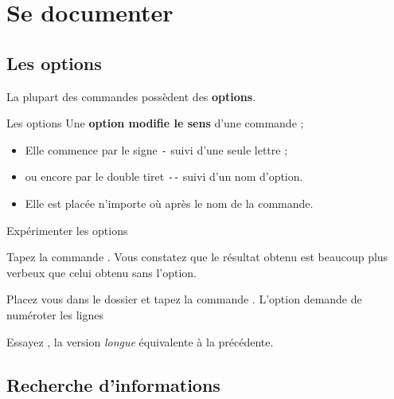 \documentclass[a4paper,11pt]{style-esi/td}
\begin{document}
\entete
\titre
{}
\lastedit

\bigskip
\tableofcontents

\newpage

\section{Se documenter}


	\subsection{Les options}
	
		La plupart des commandes possèdent des \textbf{options}.

		\begin{theorie}{Les options}
			Une \textbf{option modifie le sens} d'une commande ;
			\begin{itemize}
			\item Elle commence par le signe \texttt{-} suivi d'une seule lettre ;
			\item ou encore par le double tiret \texttt{-{}-} suivi d'un nom d'option.
			\item Elle est placée n'importe où après le nom de la commande.   
			\end{itemize}
		\end{theorie}		

		\begin{Experience}{Expérimenter les options}		
			\vspace{-1em}
			\begin{steps}
			\item Tapez la commande . 
				Vous constatez que le résultat obtenu est beaucoup plus verbeux 
				que celui obtenu sans l'option.
			\item Placez vous dans le dossier  et 
				tapez la commande . 
				L'option demande de numéroter les lignes 
			\item Essayez ,
				la version \textit{longue} équivalente à la précédente.
			\end{steps}
		\end{Experience}

	\subsection{Recherche d'informations}  
\end{document}
